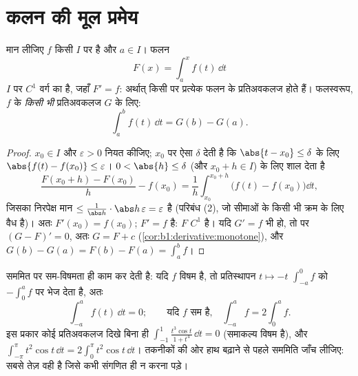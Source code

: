 \section{कलन की मूल प्रमेय}

\begin{theorem}[कलन की मूल प्रमेय]\label{thm:b1:integration:ftc}
मान लीजिए $f$ किसी  $I$ पर  है और $a \in I$। फलन
\[
F(x) = \int_a^x f(t)\, \dd t
\]
$I$ पर $C^1$ वर्ग का है, जहाँ $F' = f$: अर्थात् किसी  पर प्रत्येक 
फलन के प्रतिअवकलज होते हैं। फलस्वरूप, $f$ के \emph{किसी भी} प्रतिअवकलज $G$
के लिए:
\[
\int_a^b f(t)\,\dd t = G(b) - G(a) .
\]
\end{theorem}

\begin{proof}
$x_0 \in I$ और $\varepsilon > 0$ नियत कीजिए; $x_0$ पर  ऐसा $\delta$
देती है कि $\abs{t - x_0} \leq \delta$ के लिए $\abs{f(t) - f(x_0)} \leq
\varepsilon$। $0 < \abs{h} \leq \delta$ (और $x_0 + h \in I$) के लिए शाल देता
है
\[
\frac{F(x_0 + h) - F(x_0)}{h} - f(x_0)
= \frac 1h \int_{x_0}^{x_0+h} \bigl(f(t) - f(x_0)\bigr)\dd t ,
\]
जिसका निरपेक्ष मान $\leq \frac{1}{\abs h}\cdot \abs h\, \varepsilon =
\varepsilon$ है (परिबंध (2), जो सीमाओं के किसी भी क्रम के लिए वैध है)। अतः
$F'(x_0) = f(x_0)$; $F' = f$  है: $F$ $C^1$ है। यदि $G' = f$ भी हो, तो
 पर $(G - F)' = 0$, अतः $G = F + c$
(\cref{cor:b1:derivative:monotone}), और $G(b) - G(a) = F(b) - F(a) =
\int_a^b f$।
\end{proof}

\begin{example}\label{ex:b1:integration:parity}
सममित  पर सम-विषमता ही काम कर देती है: यदि $f$ विषम है, तो प्रतिस्थापन
$t \mapsto -t$ $\int_{-a}^{0} f$ को $-\int_0^a f$ पर भेज देता है, अतः
\[
\int_{-a}^{a} f(t)\,\dd t = 0 ;
\qquad\text{यदि $f$ सम है,}\quad
\int_{-a}^{a} f = 2\int_0^a f .
\]
इस प्रकार कोई प्रतिअवकलज दिखे बिना ही $\int_{-1}^{1} \frac{t^3\cos t}{1 +
t^4}\,\dd t = 0$ (समाकल्य विषम है), और $\int_{-\pi}^{\pi} t^2\cos t\,\dd t =
2\int_0^\pi t^2\cos t\, \dd t$। तकनीकों की ओर हाथ बढ़ाने से पहले सममिति जाँच
लीजिए: सबसे तेज़  वही है जिसे कभी संगणित ही न करना पड़े।
\end{example}

